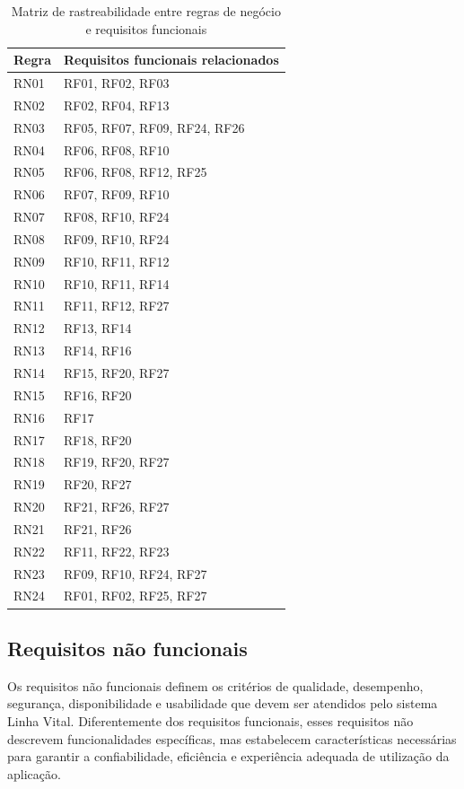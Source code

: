 \begin{table}[H]
\caption{Matriz de rastreabilidade entre regras de negócio e requisitos funcionais}
\label{tab_rastreabilidade}
\centering
\scriptsize
\begin{tabular}{p{2cm}p{11.5cm}}
\hline
\textbf{Regra} & \textbf{Requisitos funcionais relacionados} \\
\hline
RN01 & RF01, RF02, RF03 \\
RN02 & RF02, RF04, RF13 \\
RN03 & RF05, RF07, RF09, RF24, RF26 \\
RN04 & RF06, RF08, RF10 \\
RN05 & RF06, RF08, RF12, RF25 \\
RN06 & RF07, RF09, RF10 \\
RN07 & RF08, RF10, RF24 \\
RN08 & RF09, RF10, RF24 \\
RN09 & RF10, RF11, RF12 \\
RN10 & RF10, RF11, RF14 \\
RN11 & RF11, RF12, RF27 \\
RN12 & RF13, RF14 \\
RN13 & RF14, RF16 \\
RN14 & RF15, RF20, RF27 \\
RN15 & RF16, RF20 \\
RN16 & RF17 \\
RN17 & RF18, RF20 \\
RN18 & RF19, RF20, RF27 \\
RN19 & RF20, RF27 \\
RN20 & RF21, RF26, RF27 \\
RN21 & RF21, RF26 \\
RN22 & RF11, RF22, RF23 \\
RN23 & RF09, RF10, RF24, RF27 \\
RN24 & RF01, RF02, RF25, RF27 \\
\hline
\end{tabular}
\end{table}

\subsection{Requisitos não funcionais}

Os requisitos não funcionais definem os critérios de qualidade, desempenho, segurança, disponibilidade e usabilidade que devem ser atendidos pelo sistema Linha Vital. Diferentemente dos requisitos funcionais, esses requisitos não descrevem funcionalidades específicas, mas estabelecem características necessárias para garantir a confiabilidade, eficiência e experiência adequada de utilização da aplicação.

